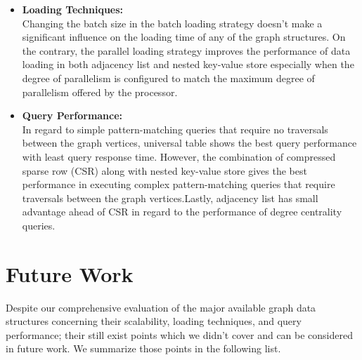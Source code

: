 {\begin{itemize}
Due to its vertical partitioning based technique, the emerging schema method consumes the least memory among the three graph properties that we tested. However, universal table and nested key-value store are taking an almost equal loading time which is less than the loading time of emerging schema. Therefore, we recommend the emerging schema method in scenarios where memory saving has a higher weight than loading time. Both universal table or nested key-value store are more suitable for faster data loading than emerging schema.\\


\item \textbf{Loading Techniques:}\\
Changing the batch size in the batch loading strategy doesn't make a significant influence on the loading time of any of the graph structures. On the contrary, the parallel loading strategy improves the performance of data loading in both adjacency list and nested key-value store especially when the degree of parallelism is configured to match the maximum degree of parallelism offered by the processor.\\

\item \textbf{Query Performance:}\\
In regard to simple pattern-matching queries that require no traversals between the graph vertices, universal table shows the best query performance with least query response time. However, the combination of compressed sparse row (CSR) along with nested key-value store gives the best performance in executing complex pattern-matching queries that require traversals between the graph vertices.Lastly, adjacency list has small advantage ahead of CSR in regard to the performance of degree centrality queries.\\

\end{itemize}





\section{Future Work}
\label{sec:futureWork}

Despite our comprehensive evaluation of the major available graph data structures concerning their scalability, loading techniques, and query performance; their still exist points which we didn't cover and can be considered in future work. We summarize those points in the following list.

}
